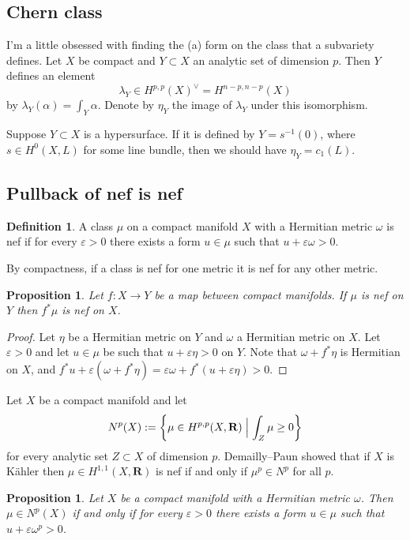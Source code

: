 \documentclass[11pt]{amsart}
\newtheorem{prop}[theo]{Proposition}
\theoremstyle{definition}
\newtheorem{defi}[theo]{Definition}
\def\eps{\varepsilon}
\def\RR{\mathbf{R}}
\begin{document}
\subsection*{Chern class}

I'm a little obsessed with finding the (a) form on the class that a subvariety defines.
Let $X$ be compact and $Y \subset X$ an analytic set of dimension $p$.
Then $Y$ defines an element
\[
\lambda_Y \in H^{p,p}(X)^\vee = H^{n-p,n-p}(X)
\]
by $\lambda_Y(\alpha) = \int_Y \alpha$.
Denote by $\eta_Y$ the image of $\lambda_Y$ under this isomorphism.

Suppose $Y \subset X$ is a hypersurface.
If it is defined by $Y = s^{-1}(0)$, where $s \in H^0(X,L)$ for some line bundle, then we should have $\eta_Y = c_1(L)$.



\subsection*{Pullback of nef is nef}

\begin{defi}
A class $\mu$ on a compact manifold $X$ with a Hermitian metric $\omega$ is nef if for every $\eps > 0$ there exists a form $u \in \mu$ such that $u + \eps \omega > 0$.
\end{defi}

By compactness, if a class is nef for one metric it is nef for any other metric.


\begin{prop}
Let $f : X \to Y$ be a map between compact manifolds.
If $\mu$ is nef on $Y$ then $f^*\mu$ is nef on $X$.
\end{prop}

\begin{proof}
Let $\eta$ be a Hermitian metric on $Y$ and $\omega$ a Hermitian metric on $X$.
Let $\eps > 0$ and let $u \in \mu$ be such that $u + \eps \eta > 0$ on $Y$.
Note that $\omega + f^*\eta$ is Hermitian on $X$, and
$f^*u + \eps(\omega + f^*\eta) = \eps \omega + f^*(u + \eps \eta) > 0$.
\end{proof}


Let $X$ be a compact manifold and let
\[
N^p(X) := \biggl\{ \mu \in H^{p,p}(X,\RR) \Bigm| \int_Z \mu \geq 0 \biggr\}
\]
for every analytic set $Z \subset X$ of dimension $p$.
Demailly--Paun showed that if $X$ is K\"ahler then $\mu \in H^{1,1}(X,\RR)$ is nef if and only if $\mu^p \in N^p$ for all $p$.


\begin{prop}
Let $X$ be a compact manifold with a Hermitian metric $\omega$.
Then $\mu \in N^p(X)$ if and only if for every $\eps > 0$ there exists a form $u \in \mu$ such that $u + \eps \omega^p > 0$.
\end{prop}
\end{document}

